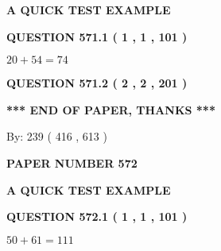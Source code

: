 \documentclass[12pt]{article}
\begin{document}
   
   
   
   
   
 \vspace{0.2in}
{\LARGE {\textbf{ A QUICK TEST EXAMPLE}}}
   
   
  
\vspace{0.2in}
  
{\textbf{\Large{QUESTION
571.1 
 ( 1 , 1 , 101 )
}}}
  
  
 
 

$ %
20 +  %
54=   %
74$
 
 
  
\vspace{0.2in}
  
{\textbf{\Large{QUESTION
571.2 
 ( 2 , 2 , 201 )
}}}
  
  
   
   
 \vspace{0.2in}
 
   
   
   
   
\vspace{1.0in} 
{\textbf{\large{ *** END OF PAPER, THANKS *** }}} 
   
   
\hspace{1.0in} By: 
 239 ( 416 ,  613 )
   
   
   
   
\newpage 
\setcounter{page}{ 
   572001 } 
   
   
   
   
 {\textbf{ \Large{ PAPER NUMBER  572  }}}
   
   
\vspace{0.2in}
   
   
   
   
   
   
 \vspace{0.2in}
{\LARGE {\textbf{ A QUICK TEST EXAMPLE}}}
   
   
  
\vspace{0.2in}
  
{\textbf{\Large{QUESTION
572.1 
 ( 1 , 1 , 101 )
}}}
  
  
 
 

$ %
50 +  %
61=   %
111$
 
\end{document}
